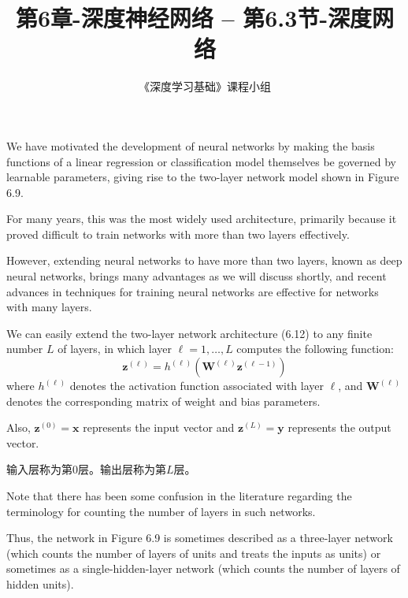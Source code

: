 \documentclass{article}
\title{第6章-深度神经网络 -- 第6.3节-深度网络}
\author{《深度学习基础》课程小组}
\begin{document}
\maketitle
\tableofcontents


We have motivated the development of neural networks by making the basis functions of a linear regression or classification model themselves be governed by learnable parameters, giving rise to the two-layer network model shown in Figure 6.9. 

For many years, this was the most widely used architecture, primarily because it proved difficult to train networks with more than two layers effectively. 

However, extending neural networks to have more than two layers, known as deep neural networks, brings many advantages as we will discuss shortly, and recent advances in techniques for training neural networks are effective for networks with many layers.

We can easily extend the two-layer network architecture (6.12) to any finite number $L$ of layers, in which layer $\ell = 1, \dots, L$ computes the following function:
\begin{equation}
    \mathbf{z}^{(\ell)} = h^{(\ell)}\left(\mathbf{W}^{(\ell)} \mathbf{z}^{(\ell-1)}\right)
    \tag{6.19}
\end{equation}
where $h^{(\ell)}$ denotes the activation function associated with layer $\ell$, and $\mathbf{W}^{(\ell)}$ denotes the corresponding matrix of weight and bias parameters. 

Also, $\mathbf{z}^{(0)} = \mathbf{x}$ represents the input vector and $\mathbf{z}^{(L)} = \mathbf{y}$ represents the output vector.

{\color{red}
输入层称为第0层。输出层称为第$L$层。
}

Note that there has been some confusion in the literature regarding the terminology for counting the number of layers in such networks. 

Thus, the network in Figure 6.9 is sometimes described as a three-layer network (which counts the number of layers of units and treats the inputs as units) or sometimes as a single-hidden-layer network (which counts the number of layers of hidden units). 
\end{document}
